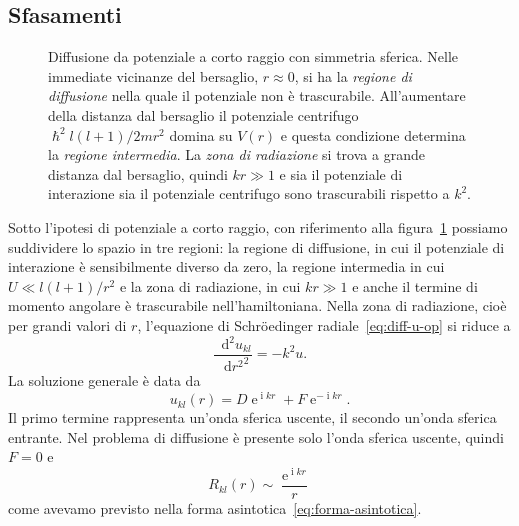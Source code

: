 \documentclass[a4paper,fleqn,twoside,12pt]{article}
\newcommand*{\dd}{\mathop{}\!\mathrm{d}} %
\DeclareMathOperator{\e}{\mathrm{e}} %
\DeclareMathOperator{\uimm}{\mathrm{i}} %
\newcommand*{\toder}[3][]{\frac{{\dd^{#1}}#2}{\dd {#3}^{#1}}}
\begin{document}
\subsection{Sfasamenti}
\label{sec:sfasamenti}

\begin{figure}
  \centering
  \caption{Diffusione da potenziale a corto raggio con simmetria sferica.  Nelle
    immediate vicinanze del bersaglio, $r \approx 0$, si ha la
    \emph{regione di diffusione} nella quale il potenziale non è trascurabile.
    All'aumentare della distanza dal bersaglio il potenziale centrifugo
    $\hslash^2 l(l+1)/2mr^2$ domina su $V(r)$ e questa condizione determina la
    \emph{regione intermedia}.  La \emph{zona di radiazione} si trova a grande
    distanza dal bersaglio, quindi $kr \gg 1$ e sia il potenziale di interazione
    sia il potenziale centrifugo sono trascurabili rispetto a $k^2$.}
\label{fig:regioni-potenziale-sferico}
\end{figure}
Sotto l'ipotesi di potenziale a corto raggio, con riferimento alla
figura~\ref{fig:regioni-potenziale-sferico} possiamo suddividere lo spazio in
tre regioni: la regione di diffusione, in cui il potenziale di interazione è
sensibilmente diverso da zero, la regione intermedia in cui $U \ll l(l+1)/r^{2}$
e la zona di radiazione, in cui $kr \gg 1$ e anche il termine di momento
angolare è trascurabile nell'hamiltoniana.  Nella zona di radiazione, cioè per
grandi valori di $r$, l'equazione di Schröedinger radiale~\eqref{eq:diff-u-op}
si riduce a
\begin{equation}
  \toder[2]{u_{kl}}{r^{2}} = -k^{2}u.
\end{equation}
La soluzione generale è data da
\begin{equation}
  u_{kl}(r) = D\e^{\uimm kr} + F\e^{-\uimm kr}.
\end{equation}
Il primo termine rappresenta un'onda sferica uscente, il secondo un'onda sferica
entrante.  Nel problema di diffusione è presente solo l'onda sferica uscente,
quindi $F = 0$ e
\begin{equation}
  R_{kl}(r) \sim \frac{\e^{\uimm kr}}{r}
\end{equation}
come avevamo previsto nella forma asintotica~\eqref{eq:forma-asintotica}.
\end{document}
